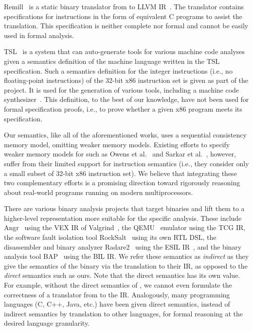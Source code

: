 Remill~\cite{McSema:Recon14} is a static binary translator from \ISA to LLVM
IR~\cite{LLVM:CGO04}. The translator contains specifications for \ISA instructions
in the form of equivalent C programs to assist the translation. This
specification is neither complete nor formal and cannot be easily used
in formal analysis.

TSL~\cite{TSL:TOPLAS13} is a system that can auto-generate tools for
various machine code analyses given a semantics definition of the machine
language written in the TSL specification. Such a semantics
definition for the integer instructions (i.e., no floating-point instructions) of the $32$-bit x86 instruction set is given
as part of the project. It is used for the generation of
various tools, including a machine code synthesizer~\cite{Srinivasan2015}.
This definition, to the best of our knowledge, have not been used
for formal specification proofs, i.e., to prove whether a given x86
program meets its specification.

Our semantics, like all of the aforementioned works, uses a sequential consistency memory model, omitting weaker memory models.
Existing efforts to specify weaker memory models for \ISA such as Owens et al.~\cite{Owens:x86-TSO} and Sarkar et al.~\cite{Sarkar:POPL09}, however, suffer from their limited support for instruction semantics (i.e., they consider only a small subset of 32-bit x86 instruction set).
We believe that integrating these two complementary efforts is a promising direction toward rigorously reasoning about real-world programs running on modern multiprocessors.

There are various binary analysis projects that target \ISA binaries
and lift them to a higher-level representation more suitable for the
specific analysis. These include Angr~\cite{Angr} using the VEX IR of Valgrind~\cite{Valgrind:ENTCS03}, the QEMU~\cite{QEMU:USENIX05} emulator
using the TCG IR, the software fault isolation tool RockSalt~\cite{Roclsalt:PLDI12} using its own RTL DSL, the disassembler and binary analyzer Radare2~\cite{Radare2} using the ESIL IR~\cite{ESIL}, and the binary analysis
tool BAP~\cite{BAP:CAV11} using the BIL IR.
We refer these semantics as \emph{indirect} as they give the semantics of the \ISA binary via the translation to their IR, as opposed to the \emph{direct} semantics such as ours.
Note that the direct semantics has its own value.
For example, without the direct semantics of \ISA, we cannot even formulate the correctness of a translator from \ISA to the IR.
Analogously, many programming languages (C, C++, Java, etc.) have been given direct semantics, instead of indirect semantics by translation to other languages, for formal reasoning at the desired language granularity. 

